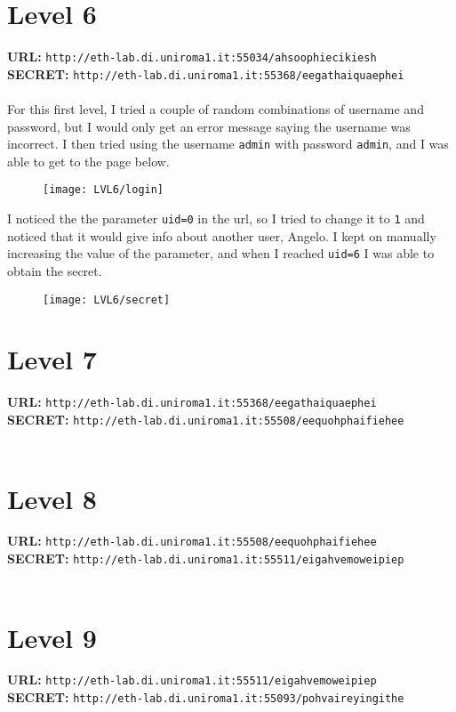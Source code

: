 \documentclass[12pt,a4paper]{article}
\begin{document}
	\section*{Level 6}
	\textbf{URL: }\texttt{http://eth-lab.di.uniroma1.it:55034/ahsoophiecikiesh }\\
	\textbf{SECRET: }\texttt{http://eth-lab.di.uniroma1.it:55368/eegathaiquaephei}\\\\
	For this first level, I tried a couple of random combinations of username and password, but I would only get an error message saying the username was incorrect. I then tried using the username \texttt{admin} with password \texttt{admin}, and I was able to get to the page below.
	\begin{figure}[H]
		\centering
		\texttt{[image: LVL6/login]}
		\label{fig:login6}
	\end{figure}
	I noticed the the parameter \texttt{uid=0} in the url, so I tried to change it to \texttt{1} and noticed that it would give info about another user, Angelo. I kept on manually increasing the value of the parameter, and when I reached \texttt{uid=6} I was able to obtain the secret.
	\begin{figure}[H]
		\centering
		\texttt{[image: LVL6/secret]}
		\label{fig:secret6}
	\end{figure}


	\section*{Level 7}
	\textbf{URL: }\texttt{http://eth-lab.di.uniroma1.it:55368/eegathaiquaephei}\\
	\textbf{SECRET: }\texttt{http://eth-lab.di.uniroma1.it:55508/eequohphaifiehee}\\\\


	\section*{Level 8}
	\textbf{URL: }\texttt{http://eth-lab.di.uniroma1.it:55508/eequohphaifiehee}\\
	\textbf{SECRET: }\texttt{http://eth-lab.di.uniroma1.it:55511/eigahvemoweipiep}\\\\


	\section*{Level 9}
	\textbf{URL: }\texttt{http://eth-lab.di.uniroma1.it:55511/eigahvemoweipiep}\\
	\textbf{SECRET: }\texttt{http://eth-lab.di.uniroma1.it:55093/pohvaireyingithe}\\\\
\end{document}
